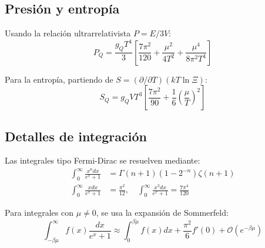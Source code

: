 \subsection{Presión y entropía}
Usando la relación ultrarrelativista $P = E/3V$:
\begin{equation}
P_Q = \frac{g_Q T^4}{3} \left[ \frac{7\pi^2}{120} + \frac{\mu^2}{4T^2} + \frac{\mu^4}{8\pi^2 T^4} \right]
\end{equation}

Para la entropía, partiendo de $S = (\partial/\partial T)(kT \ln \Xi)$:
\begin{equation}
S_Q = g_Q V T^3 \left[ \frac{7\pi^2}{90} + \frac{1}{6}\left(\frac{\mu}{T}\right)^2 \right]
\end{equation}

\subsection{Detalles de integración}
\label{sec:FD_integrals}
Las integrales tipo Fermi-Dirac se resuelven mediante:
\begin{align}
\int_0^\infty \frac{x^n dx}{e^x + 1} &= \Gamma(n+1)\left(1 - 2^{-n}\right)\zeta(n+1) \\
\int_0^\infty \frac{x dx}{e^x + 1} &= \frac{\pi^2}{12}, \quad \int_0^\infty \frac{x^3 dx}{e^x + 1} = \frac{7\pi^4}{120}
\end{align}

Para integrales con $\mu \neq 0$, se usa la expansión de Sommerfeld:
\begin{equation}
\int_{-\beta\mu}^\infty f(x) \frac{dx}{e^x + 1} \approx \int_0^{\beta\mu} f(x) dx + \frac{\pi^2}{6} f'(0) + \mathcal{O}(e^{-\beta\mu})
\end{equation}



